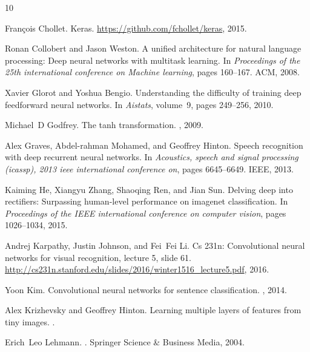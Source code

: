 \documentclass[a4paper]{article}
\begin{document}


\begin{thebibliography}{10}

François Chollet.
\newblock Keras.
\newblock \url{https://github.com/fchollet/keras}, 2015.

Ronan Collobert and Jason Weston.
\newblock A unified architecture for natural language processing: Deep neural
  networks with multitask learning.
\newblock In {\em Proceedings of the 25th international conference on Machine
  learning}, pages 160--167. ACM, 2008.

Xavier Glorot and Yoshua Bengio.
\newblock Understanding the difficulty of training deep feedforward neural
  networks.
\newblock In {\em Aistats}, volume~9, pages 249--256, 2010.

Michael~D Godfrey.
\newblock The tanh transformation.
, 2009.

Alex Graves, Abdel-rahman Mohamed, and Geoffrey Hinton.
\newblock Speech recognition with deep recurrent neural networks.
\newblock In {\em Acoustics, speech and signal processing (icassp), 2013 ieee
  international conference on}, pages 6645--6649. IEEE, 2013.

Kaiming He, Xiangyu Zhang, Shaoqing Ren, and Jian Sun.
\newblock Delving deep into rectifiers: Surpassing human-level performance on
  imagenet classification.
\newblock In {\em Proceedings of the IEEE international conference on computer
  vision}, pages 1026--1034, 2015.

Andrej Karpathy, Justin Johnson, and Fei~Fei Li.
\newblock Cs 231n: Convolutional neural networks for visual recognition,
  lecture 5, slide 61.
\newblock \url{http://cs231n.stanford.edu/slides/2016/winter1516_lecture5.pdf},
  2016.

Yoon Kim.
\newblock Convolutional neural networks for sentence classification.
, 2014.

Alex Krizhevsky and Geoffrey Hinton.
\newblock Learning multiple layers of features from tiny images.
.

Erich~Leo Lehmann.
.
\newblock Springer Science \& Business Media, 2004.


\end{thebibliography}
\end{document}
